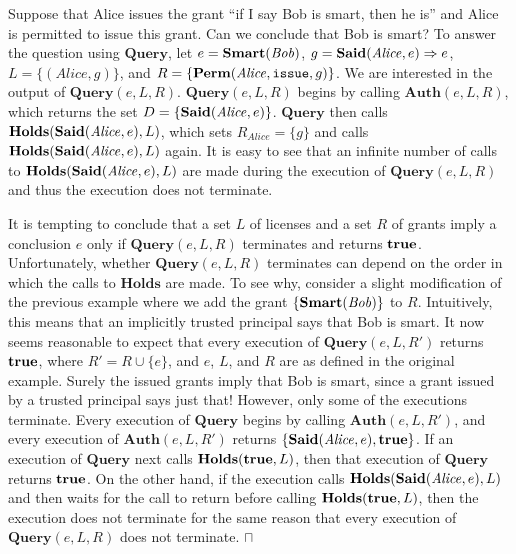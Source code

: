 \documentclass{acmtrans2m}
\newcommand{\xam}{\begin{example}}
\newcommand{\exam}{\bbox\end{example}}
\newcommand{\wbox}{\mbox{$\sqcap$\llap{$\sqcup$}}}
\newcommand{\bbox}{\wbox}
\newcommand{\rimp}{\Rightarrow}
\newcommand{\<}{
}
\renewcommand{\>}{\rangle}
\newcommand{\union}{\cup}
\newcommand{\Said}{\mathit{\bf Said}}
\newcommand{\true}{\mathit{\bf{true}}}
\newcommand{\Permitted}{\mathit{\bf Perm}}
\newcommand{\cc}{e}
\newcommand{\issue}{\mathtt{issue}}
\newcommand{\XA}{\textbf{Auth}}
\newcommand{\CMet}{\textbf{Holds}}
\newcommand{\XProc}{\textbf{Query}}
\begin{document}
\xam\label{ex:terminate}
Suppose that Alice issues the grant ``if I say Bob is smart, then he is'' and Alice is permitted to
issue this grant.  Can we conclude that Bob is smart?  To answer the
question using $\XProc$, let
$\cc = {\bf Smart}(\mathit{Bob})$, $g = \Said(\mathit{Alice}, \cc)\rimp \cc$,
$L = \{(\mathit{Alice}, g)\}$, and $R = \{\Permitted(\mathit{Alice}, \issue, g)\}$.  We are interested
in the output of $\XProc(\cc, L, R)$.  $\XProc(\cc, L, R)$ begins by calling  $\XA(\cc, L, R)$, which
returns the set $D = \{\Said(\mathit{Alice}, \cc)\}$.  $\XProc$ then calls
$\CMet(\Said(\mathit{Alice}, \cc), L)$, which sets $R_{\mathit{Alice}} = \{g\}$ and calls
$\CMet(\Said(\mathit{Alice}, \cc), L)$ again.  It is easy to see that an infinite number of calls to
$\CMet(\Said(\mathit{Alice}, \cc), L)$ are made during the execution of $\XProc(\cc, L, R)$ and thus
the execution does not terminate.

It is tempting to conclude that a set $L$ of licenses and a set $R$ of grants imply a conclusion $\cc$
only if $\XProc(\cc, L, R)$ terminates and returns $\true$.  Unfortunately, whether $\XProc(\cc, L, R)$
terminates can depend on the order in which the calls to $\CMet$ are made.  To see why, consider a
slight modification of the previous example where we add the grant
$\{\mathit{\bf Smart}(\mathit{Bob})\}$ to $R$.  Intuitively, this means that an implicitly trusted
principal says that Bob is smart.  It now seems reasonable to expect that every execution of
$\XProc(\cc, L, R')$ returns $\true$, where $R' = R\union \{\cc\}$, and $\cc$, $L$, and $R$ are as
defined in the original example.  Surely the issued grants imply that Bob is smart, since a grant
issued by a trusted principal says just that!  However, only some of the executions terminate.  Every
execution of $\XProc$ begins by calling $\XA(\cc, L, R')$, and every execution of $\XA(\cc, L, R')$
returns $\{\Said(\mathit{Alice}, \cc), \true\}$.  If an execution of $\XProc$ next calls
$\CMet(\true, L)$, then that execution of $\XProc$ returns $\true$.  On
the other hand, if the 
execution calls $\CMet(\Said(\mathit{Alice}, \cc), L)$ and then waits for the call to return before
calling $\CMet(\true, L)$, then the execution does not terminate for the same reason that every
execution of $\XProc(\cc, L, R)$ does not terminate.
\exam
\end{document}
